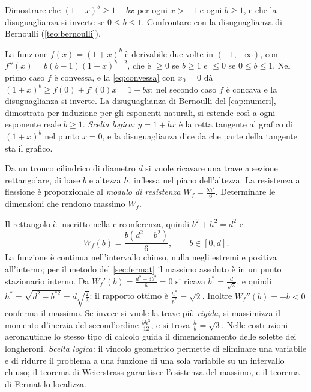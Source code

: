 \begin{esercizio}\label{es:bernoulli-convessita}
Dimostrare che $(1+x)^{b}\ge1+bx$ per ogni $x>-1$ e ogni $b\ge1$, e che la disuguaglianza
si inverte se $0\le b\le1$. Confrontare con la disuguaglianza di Bernoulli
(\cref{teo:bernoulli}).
\begin{soluzione}
La funzione $f(x)=(1+x)^{b}$ è derivabile due volte in $(-1,+\infty)$, con
$f''(x)=b(b-1)(1+x)^{b-2}$, che è $\ge0$ se $b\ge1$ e $\le0$ se $0\le b\le1$. Nel primo
caso $f$ è convessa, e la \eqref{eq:convessa} con $x_{0}=0$ dà
$(1+x)^{b}\ge f(0)+f'(0)x=1+bx$; nel secondo caso $f$ è concava e la disuguaglianza si
inverte. La disuguaglianza di Bernoulli del \cref{cap:numeri}, dimostrata per induzione
per gli esponenti naturali, si estende così a ogni esponente reale $b\ge1$.
\emph{Scelta logica:} $y=1+bx$ è la retta tangente al grafico di $(1+x)^{b}$ nel punto
$x=0$, e la disuguaglianza dice da che parte della tangente sta il grafico.
\end{soluzione}
\end{esercizio}

\begin{esercizio}\label{es:trave}
Da un tronco cilindrico di diametro $d$ si vuole ricavare una trave a sezione
rettangolare, di base $b$ e altezza $h$, inflessa nel piano dell'altezza. La resistenza a
flessione è proporzionale al \emph{modulo di resistenza} $W_{f}=\frac{bh^{2}}6$.
Determinare le dimensioni che rendono massimo $W_{f}$.
\begin{soluzione}
Il rettangolo è inscritto nella circonferenza, quindi $b^{2}+h^{2}=d^{2}$ e
\[
  W_{f}(b)=\frac{b(d^{2}-b^{2})}{6}, \qquad b\in[0,d] .
\]
La funzione è continua nell'intervallo chiuso, nulla negli estremi e positiva
all'interno; per il metodo del \cref{sec:fermat} il massimo assoluto è in un punto
stazionario interno. Da $W_{f}'(b)=\frac{d^{2}-3b^{2}}6=0$ si ricava $b^{*}=\frac d{\sqrt3}$,
e quindi $h^{*}=\sqrt{d^{2}-b^{*2}}=d\sqrt{\frac23}$: il rapporto ottimo è
$\frac{h^{*}}{b^{*}}=\sqrt2$. Inoltre $W_{f}''(b)=-b<0$ conferma il massimo. Se invece
si vuole la trave più \emph{rigida}, si massimizza il momento d'inerzia del
second'ordine $\frac{bh^{3}}{12}$, e si trova $\frac hb=\sqrt3$. Nelle costruzioni
aeronautiche lo stesso tipo di calcolo guida il dimensionamento delle solette dei
longheroni. \emph{Scelta logica:} il vincolo geometrico permette di eliminare una
variabile e di ridurre il problema a una funzione di una sola variabile su un intervallo
chiuso; il teorema di Weierstrass garantisce l'esistenza del massimo, e il teorema di
Fermat lo localizza.
\end{soluzione}
\end{esercizio}

